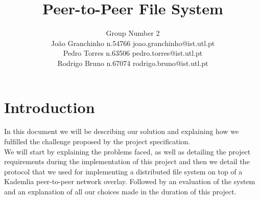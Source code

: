 \documentclass[times,9pt,article]{llncs}
\begin{document}
\title{Peer-to-Peer File System}

\author{Group Number 2 \\
Jo\~ao Granchinho n.54766 joao.granchinho@ist.utl.pt \\
Pedro Torres  n.63506 pedro.torres@ist.utl.pt \\
Rodrigo Bruno n.67074 rodrigo.bruno@ist.utl.pt}
\maketitle


\section{Introduction}
In this document we will be describing our solution and explaining how we fulfilled the challenge proposed by the project specification.\\
We will start by explaining the problems faced, as well as detailing the project requirements during the implementation of this project and then we detail the protocol that we used for implementing a distributed
file system on top of a Kademlia peer-to-peer network overlay. Followed by an evaluation of the system and an explanation of all our choices made in the duration of this project.


\end{document}
